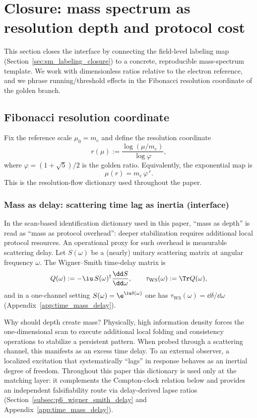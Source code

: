 \section{Closure: mass spectrum as resolution depth and protocol cost}
\label{sec:mass_spectrum_closure}

This section closes the interface by connecting the field-level labeling map (Section~\ref{sec:sm_labeling_closure}) to a concrete, reproducible mass-spectrum template.
We work with dimensionless ratios relative to the electron reference, and we phrase running/threshold effects in the Fibonacci resolution coordinate of the golden branch.

\subsection{Fibonacci resolution coordinate}
\label{subsec:mass_resolution_coordinate}

Fix the reference scale $\mu_0=m_e$ and define the resolution coordinate
\begin{equation}\label{eq:r_of_mu_z128}
r(\mu):=\frac{\log(\mu/m_e)}{\log\varphi},
\end{equation}
where $\varphi=(1+\sqrt{5})/2$ is the golden ratio.
Equivalently, the exponential map is
\begin{equation}\label{eq:mu_of_r_z128}
\mu(r)=m_e\,\varphi^{\,r}.
\end{equation}
This is the resolution-flow dictionary used throughout the paper.

\subsubsection{Mass as delay: scattering time lag as inertia (interface)}
\label{subsubsec:mass_as_delay_interface}
In the scan-based identification dictionary used in this paper, ``mass as depth'' is read as ``mass as protocol overhead'': deeper stabilization requires additional local protocol resources.
An operational proxy for such overhead is measurable scattering delay.
Let $S(\omega)$ be a (nearly) unitary scattering matrix at angular frequency $\omega$.
The Wigner--Smith time-delay matrix is
\[
Q(\omega):=-\iu\,S(\omega)^\dagger\frac{\dd S}{\dd \omega},
\qquad
\tau_{\mathrm{WS}}(\omega):=\Tr Q(\omega),
\]
and in a one-channel setting $S(\omega)=\e^{\iu\delta(\omega)}$ one has $\tau_{\mathrm{WS}}(\omega)=\dd\delta/\dd\omega$ (Appendix~\ref{app:time_mass_delay}).

Why should depth create mass?
Physically, high information density forces the one-dimensional scan to execute additional local folding and consistency operations to stabilize a persistent pattern.
When probed through a scattering channel, this manifests as an excess time delay.
To an external observer, a localized excitation that systematically ``lags'' in response behaves as an inertial degree of freedom.
Throughout this paper this dictionary is used only at the matching layer: it complements the Compton-clock relation below and provides an independent falsifiability route via delay-derived lapse ratios (Section~\ref{subsec:p6_wigner_smith_delay} and Appendix~\ref{app:time_mass_delay}).

